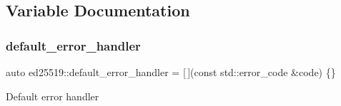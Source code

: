 \subsection{Variable Documentation}
\mbox{\label{namespaceed25519_a7c7bb6ed17541162959c33ed3e3b15fb}} 
\subsubsection{\texorpdfstring{default\+\_\+error\+\_\+handler}{default\_error\_handler}}
{\footnotesize\ttfamily auto ed25519\+::default\+\_\+error\+\_\+handler = \mbox{[}$\,$\mbox{]}(const std\+::error\+\_\+code \&code) \{\}\hspace{0.3cm}{\ttfamily [static]}}

Default error handler 